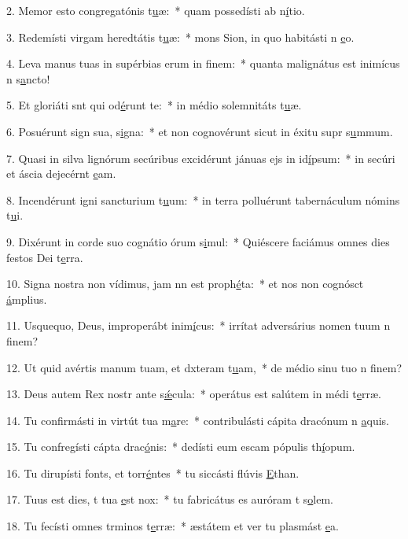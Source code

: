 2. Memor esto congregatónis t\uline{u}æ:~* quam possedísti ab n\uline{í}tio.\par 
3. Redemísti virgam heredtátis t\uline{u}æ:~* mons Sion, in quo habitásti n \uline{e}o.\par 
4. Leva manus tuas in supérbias erum in f\uline{i}nem:~* quanta malignátus est inimícus n s\uline{a}ncto!\par 
5. Et gloriáti snt qui od\uline{é}runt te:~* in médio solemnitáts t\uline{u}æ.\par 
6. Posuérunt sign sua, s\uline{i}gna:~* et non cognovérunt sicut in éxitu supr s\uline{u}mmum.\par 
7. Quasi in silva lignórum secúribus excidérunt jánuas ejs in id\uline{í}psum:~* in secúri et áscia dejecérnt \uline{e}am.\par 
8. Incendérunt igni sancturium t\uline{u}um:~* in terra polluérunt tabernáculum nómins t\uline{u}i.\par 
9. Dixérunt in corde suo cognátio órum s\uline{i}mul:~* Quiéscere faciámus omnes dies festos Dei  t\uline{e}rra.\par 
10. Signa nostra non vídimus, jam nn est proph\uline{é}ta:~* et nos non cognósct \uline{á}mplius.\par 
11. Usquequo, Deus, improperábt inim\uline{í}cus:~* irrítat adversárius nomen tuum n f\uline{i}nem?\par 
12. Ut quid avértis manum tuam, et dxteram t\uline{u}am,~* de médio sinu tuo n f\uline{i}nem?\par 
13. Deus autem Rex nostr ante s\uline{ǽ}cula:~* operátus est salútem in médi t\uline{e}rræ.\par 
14. Tu confirmásti in virtút tua m\uline{a}re:~* contribulásti cápita dracónum n \uline{a}quis.\par 
15. Tu confregísti cápta drac\uline{ó}nis:~* dedísti eum escam pópulis th\uline{í}opum.\par 
16. Tu dirupísti fonts, et torr\uline{é}ntes~* tu siccásti flúvis \uline{E}than.\par 
17. Tuus est dies, t tua \uline{e}st nox:~* tu fabricátus es auróram t s\uline{o}lem.\par 
18. Tu fecísti omnes trminos t\uline{e}rræ:~* æstátem et ver tu plasmást \uline{e}a.\par 
